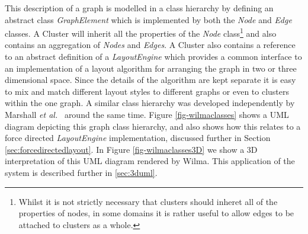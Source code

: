 \documentclass[runningheads]{cl2emult}
\begin{document}
This description of a graph is modelled in a class hierarchy by
defining an abstract class {\em GraphElement} which is implemented by
both the {\em Node} and {\em Edge} classes.  A {Cluster} will inherit
all the properties of the {\em Node} class\footnote{Whilst it is not strictly
necessary that clusters should inheret all of the properties of nodes, in some
domains it is rather useful to allow edges to be attached to clusters as a
whole.} and also contains an
aggregation of {\em Nodes} and {\em Edges}.  A {Cluster} also contains
a reference to an abstract definition of a {\em LayoutEngine} which
provides a common interface to an implementation of a layout algorithm
for arranging the graph in two or three dimensional space.  Since the
details of the algorithm are kept separate it is easy to mix and match
different layout styles to different graphs or even to clusters within
the one graph.  A similar class hierarchy was developed independently
by Marshall {\em et al.}~\cite{marshall00object} around the same time.
Figure \ref{fig-wilmaclasses} shows a UML diagram depicting this
graph class hierarchy, and also shows how this relates to a force
directed {\em LayoutEngine} implementation, discussed further in
Section \ref{sec:forcedirectedlayout}.  In Figure
\ref{fig-wilmaclasses3D} we show a 3D
interpretation of this UML diagram rendered by Wilma.  This application
of the system is described further in \ref{sec:3duml}.
\end{document}
